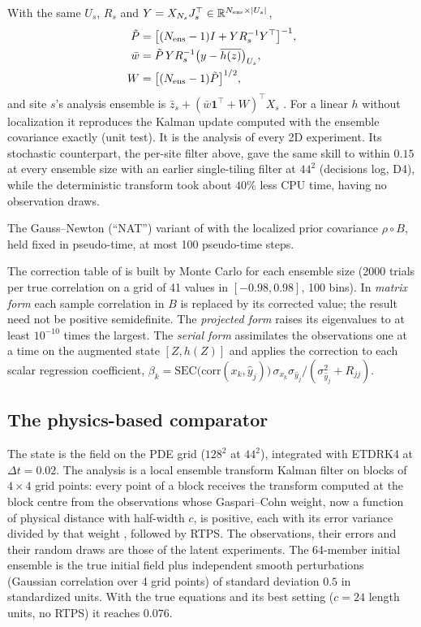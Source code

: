  With the same $U_s$, $R_s$ and
$Y=X_{N_s}J_s^\top\in\mathbb{R}^{N_{\mathrm{ens}}\times|U_s|}$,
\begin{equation}
\begin{aligned}
  \tilde P &= \big[(N_{\mathrm{ens}}-1)I+YR_s^{-1}Y^\top\big]^{-1},\\
  \bar w &= \tilde P\,YR_s^{-1}\big(y-\overline{h(z)}\big)_{U_s},\\
  W &= \big[(N_{\mathrm{ens}}-1)\tilde P\big]^{1/2},
\end{aligned}
\end{equation}
and site $s$'s analysis ensemble is $\bar z_s + (\bar w\mathbf 1^\top+W)^\top X_s$
\citep{hunt2007}. For a linear $h$ without localization it reproduces
the Kalman update computed with the ensemble covariance exactly (unit
test). It is the analysis of every 2D experiment. Its stochastic counterpart, the per-site filter
above, gave the same skill to within $0.15$ at every ensemble size with an earlier single-tiling
filter at $44^2$ (decisions log, D4), while the deterministic transform took about $40\%$ less
CPU time, having no observation draws.

 The Gauss--Newton (``NAT'') variant of
\citet{huvanleeuwen2021} with the localized prior covariance $\rho\circ B$,
held fixed in pseudo-time, at most 100 pseudo-time steps.

 The correction table of
\citet{anderson2012} is built by Monte Carlo for each ensemble size
(2000 trials per true correlation on a grid of 41 values in
$[-0.98,0.98]$, 100 bins). In \emph{matrix form} each sample correlation in
$B$ is replaced by its corrected value; the result need not be positive
semidefinite. The \emph{projected form} raises its eigenvalues to at
least $10^{-10}$ times the largest. The \emph{serial form} assimilates the
observations one at a time on the augmented state $[Z,h(Z)]$ and applies
the correction to each scalar regression coefficient,
$\beta_k=\mathrm{SEC}\big(\mathrm{corr}(x_k,\hat y_j)\big)\,\sigma_{x_k}\sigma_{\hat y_j}/(\sigma^2_{\hat y_j}+R_{jj})$.

\subsection{The physics-based comparator}
\label{app:da_comparator}

 The state is the field on the PDE grid ($128^2$ at $44^2$), integrated with ETDRK4 at
$\Delta t=0.02$. The analysis is a local ensemble transform Kalman filter on blocks of $4\times4$ grid
points: every point of a block receives the transform computed at the block centre from the
observations whose Gaspari--Cohn weight, now a function of physical distance with half-width $c$, is
positive, each with its error variance divided by that weight \citep{hunt2007}, followed by RTPS. The
observations, their errors and their random draws are those of the latent experiments. The
64-member initial ensemble is the true initial field plus independent smooth perturbations (Gaussian
correlation over 4 grid points) of standard deviation $0.5$ in standardized units. With the true
equations and its best setting ($c=24$ length units, no RTPS) it reaches $0.076$.

